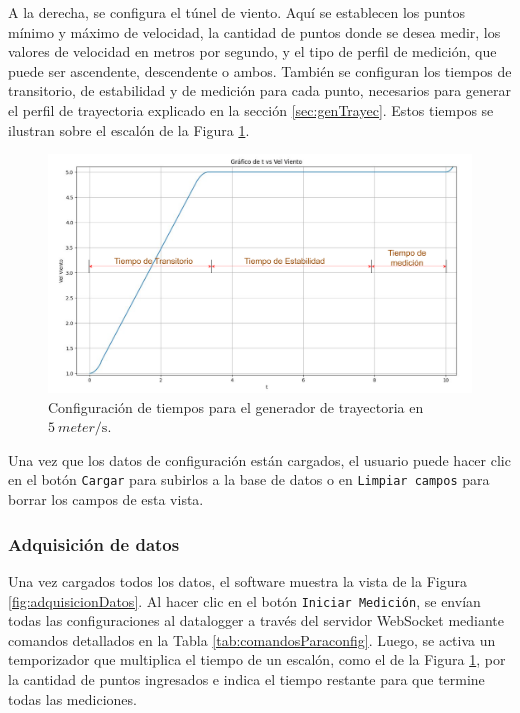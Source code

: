 A la derecha, se configura el túnel de viento. Aquí se establecen los puntos mínimo y máximo de velocidad, la cantidad de puntos donde se desea medir, los valores de velocidad en metros por segundo, y el tipo de perfil de medición, que puede ser ascendente, descendente o ambos. También se configuran los tiempos de transitorio, de estabilidad y de medición para cada punto, necesarios para generar el perfil de trayectoria explicado en la sección \ref{sec:genTrayec}. Estos tiempos se ilustran sobre el escalón de la Figura \ref{fig:curvaEscalon}.

\begin{figure}[H]
    \centering
    \includegraphics[width=1\linewidth]{Figuras/AplicacionWeb/frondend/curvaEscalon.png}
    \caption{Configuración de tiempos para el generador de trayectoria en $\SI{5}{meter\per\second}$.}
    \label{fig:curvaEscalon}
\end{figure}

Una vez que los datos de configuración están cargados, el usuario puede hacer clic en el botón \texttt{Cargar} para subirlos a la base de datos o en \texttt{Limpiar campos} para borrar los campos de esta vista.


\subsubsection{Adquisición de datos}\label{sec:adquisicionDatos}

Una vez cargados todos los datos, el software muestra la vista de la Figura \ref{fig:adquisicionDatos}. Al hacer clic en el botón \texttt{Iniciar Medición}, se envían todas las configuraciones al datalogger a través del servidor WebSocket mediante comandos detallados en la Tabla \ref{tab:comandosParaconfig}. Luego, se activa un temporizador que multiplica el tiempo de un escalón, como el de la Figura \ref{fig:curvaEscalon}, por la cantidad de puntos ingresados e indica el tiempo restante para que termine todas las mediciones. 

